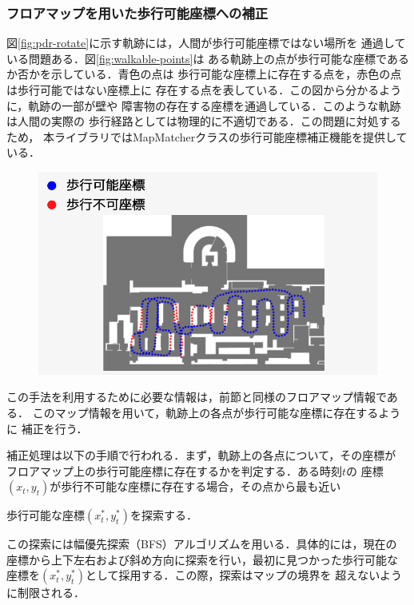 
\subsubsection{フロアマップを用いた歩行可能座標への補正}

図\ref{fig:pdr-rotate}に示す軌跡には，人間が歩行可能座標ではない場所を
通過している問題ある．図\ref{fig:walkable-points}は
ある軌跡上の点が歩行可能な座標であるか否かを示している．青色の点は
歩行可能な座標上に存在する点を，赤色の点は歩行可能ではない座標上に
存在する点を表している．この図から分かるように，軌跡の一部が壁や
障害物の存在する座標を通過している．このような軌跡は人間の実際の
歩行経路としては物理的に不適切である．この問題に対処するため，
本ライブラリではMapMatcherクラスの歩行可能座標補正機能を提供している．

\begin{figure}[H]
    \centering
    \includegraphics[width=\linewidth]{image/unwalkable_points.jpg}
    \caption{}    \label{fig:unwalkable_points}
\end{figure}

この手法を利用するために必要な情報は，前節と同様のフロアマップ情報である．
このマップ情報を用いて，軌跡上の各点が歩行可能な座標に存在するように
補正を行う．

補正処理は以下の手順で行われる．まず，軌跡上の各点について，その座標が
フロアマップ上の歩行可能座標に存在するかを判定する．ある時刻$t$の
座標$(x_t, y_t)$が歩行不可能な座標に存在する場合，その点から最も近い

歩行可能な座標$(x_t^*, y_t^*)$を探索する．

この探索には幅優先探索（BFS）アルゴリズムを用いる．具体的には，現在の
座標から上下左右および斜め方向に探索を行い，最初に見つかった歩行可能な
座標を$(x_t^*, y_t^*)$として採用する．この際，探索はマップの境界を
超えないように制限される．

